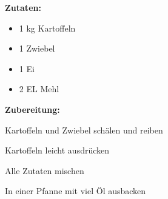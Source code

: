 

\textbf {Zutaten:} \\
\begin{itemize}
	\item 1 kg Kartoffeln
	\item 1 Zwiebel
	\item 1 Ei
	\item 2 EL Mehl
\end{itemize}

\vspace* {2cm}

\textbf {Zubereitung:} \\
\begin{compactenum}
	\item Kartoffeln und Zwiebel schälen und reiben
	\item Kartoffeln leicht ausdrücken
	\item Alle Zutaten mischen
	\item In einer Pfanne mit viel Öl ausbacken
\end{compactenum}


